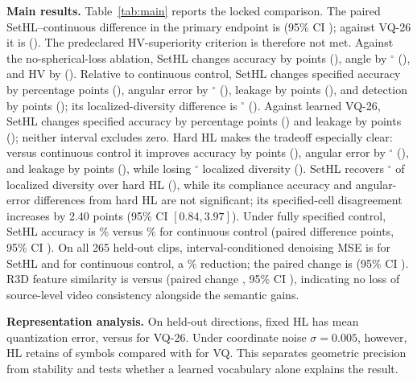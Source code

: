 \documentclass{article}
\begin{document}
\textbf{Main results.}
Table~\ref{tab:main} reports the locked comparison.
The paired SetHL--continuous difference in the primary endpoint is
\PrimaryDelta{} (95\% CI \PrimaryCI); against VQ-26 it is
\VQDelta{} (\VQCI). The predeclared HV-superiority criterion is therefore not
met. Against the no-spherical-loss ablation, SetHL
changes accuracy by \SphericalAccDelta{} points (\SphericalAccCI), angle by
\SphericalAngDelta$^\circ$ (\SphericalAngCI), and HV by \SphericalDelta{}
(\SphericalCI).
Relative to continuous control, SetHL changes specified accuracy by
\ContAccDelta{} percentage points (\ContAccCI), angular error by \ContAngDelta$^\circ$
(\ContAngCI), leakage by \ContLeakDelta{} points (\ContLeakCI), and detection
by \ContDetectionDelta{} points (\ContDetectionCI); its localized-diversity
difference is \ContLocalizedDelta$^\circ$ (\ContLocalizedCI).
Against learned VQ-26, SetHL changes specified accuracy by \VQAccDelta{}
percentage points (\VQAccCI) and leakage by \VQLeakDelta{} points
(\VQLeakCI); neither interval excludes zero. Hard HL makes the tradeoff
especially clear: versus continuous control it improves accuracy by
\HardContAccDelta{} points (\HardContAccCI), angular error by
\HardContAngDelta$^\circ$ (\HardContAngCI), and leakage by
\HardContLeakDelta{} points (\HardContLeakCI), while losing
\HardContLocalizedDelta$^\circ$ localized diversity
(\HardContLocalizedCI). SetHL recovers \SetHardLocalizedDelta$^\circ$ of
localized diversity over hard HL (\SetHardLocalizedCI), while its compliance
accuracy and angular-error differences from hard HL are not significant; its
specified-cell disagreement increases by 2.40 points (95\% CI
$[0.84,3.97]$). Under fully specified control, SetHL accuracy is
\FullSetAcc\% versus \FullContAcc\% for continuous control (paired difference
\FullAccDelta{} points, 95\% CI \FullAccCI). On all 265 held-out clips,
interval-conditioned denoising MSE is \DenoiseSet{} for SetHL and
\DenoiseCont{} for continuous control, a \DenoiseRelative\% reduction; the
paired change is \DenoiseDelta{} (95\% CI \DenoiseCI). R3D feature similarity
is \VideoFeatureSet{} versus \VideoFeatureCont{} (paired change
\VideoFeatureDelta{}, 95\% CI \VideoFeatureCI), indicating no loss
of source-level video consistency alongside the semantic gains.

\textbf{Representation analysis.}
On held-out directions, fixed HL has \HLQuantDeg{} mean quantization error,
versus \VQQuantDeg{} for VQ-26.  Under coordinate noise $\sigma=0.005$, however,
HL retains \HLStability{} of symbols compared with \VQStability{} for VQ.
This separates geometric precision from stability and tests whether a learned
vocabulary alone explains the result.
\end{document}
